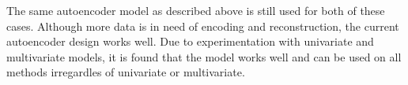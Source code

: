 The same autoencoder model as described above is still used for both of these cases.
Although more data is in need of encoding and reconstruction,
the current autoencoder design works well.
Due to experimentation with univariate and multivariate models,
it is found that the model works well and can be used on all methods irregardles of univariate or multivariate.




